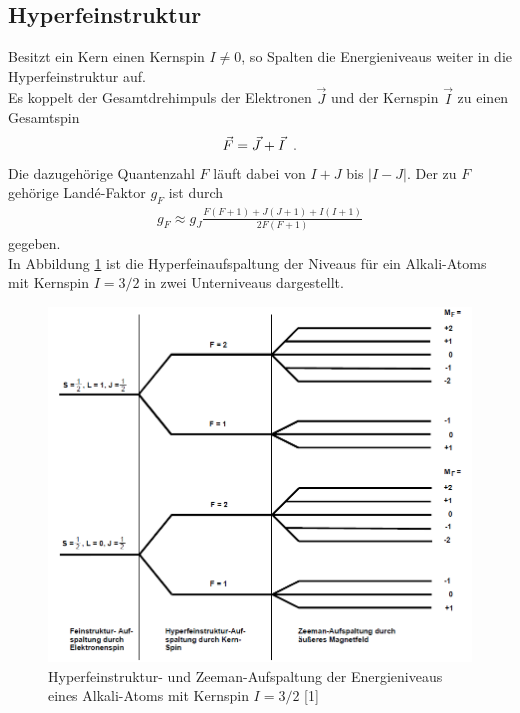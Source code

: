 \documentclass[]{scrartcl}
\begin{document}
\subsection{Hyperfeinstruktur}
Besitzt ein Kern einen Kernspin $I\ne 0$, so Spalten die Energieniveaus weiter in die Hyperfeinstruktur auf.\\
Es koppelt der Gesamtdrehimpuls der Elektronen $\vec{J}$ und der Kernspin $\vec{I}$ zu einen Gesamtspin
\begin{align}
\vec{F}=\vec{J}+\vec{I} \hspace{0.2cm}\text{.}
\label{eq:gesamtdrehimpuls}
\end{align}
Die dazugehörige Quantenzahl $F$ läuft dabei von $I+J$ bis $\left| I-J\right|$. Der zu $F$ gehörige Landé-Faktor $g_F$ ist durch
\begin{align}
g_F\approx g_J\frac{F\left(F+1\right)+J\left(J+1\right)+I\left(I+1\right)}{2F\left(F+1\right)}
\label{eq:landefaktoren}
\end{align}
gegeben.\\
In Abbildung \ref{fig:hyperfeinaufspaltungbeispiel} ist die Hyperfeinaufspaltung der Niveaus für ein Alkali-Atoms mit Kernspin $I = 3/2$ in zwei Unterniveaus dargestellt.
\begin{figure}[H]
\centering
\includegraphics[width=\textwidth]{images/aufspaltunghyperfein.png}
\caption{Hyperfeinstruktur- und Zeeman-Aufspaltung der Energieniveaus eines Alkali-Atoms mit Kernspin $I = 3/2$ [1]}
\label{fig:hyperfeinaufspaltungbeispiel}
\end{figure}
\end{document}
